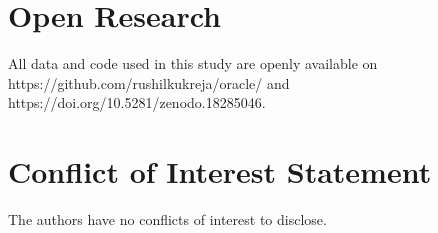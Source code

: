 \documentclass[pdflatex,sn-mathphys-num]{sn-jnl}
\theoremstyle{thmstyleone}%
\theoremstyle{thmstyletwo}%
\theoremstyle{thmstylethree}%
\begin{document}
\section{Open Research}\label{sec8}
All data and code used in this study are openly available on https://github.com/rushilkukreja/oracle/ and https://doi.org/10.5281/zenodo.18285046.

\section{Conflict of Interest  Statement}\label{sec9}
The authors have no conflicts of interest to disclose.


\end{document}
